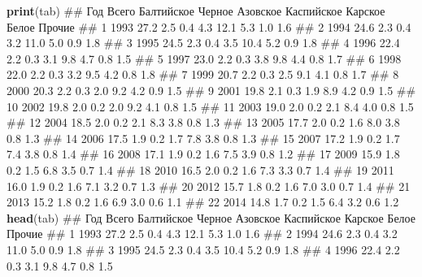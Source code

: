\documentclass[]{book}
\newenvironment{Shaded}{\begin{snugshade}}{\end{snugshade}}
\newcommand{\KeywordTok}[1]{\textcolor[rgb]{0.13,0.29,0.53}{\textbf{#1}}}
\newcommand{\NormalTok}[1]{#1}
\begin{document}
\begin{Shaded}
\begin{Highlighting}[]
\KeywordTok{print}\NormalTok{(tab)}
\NormalTok{##     Год Всего Балтийское Черное Азовское Каспийское Карское Белое Прочие}
\NormalTok{## 1  1993  27.2        2.5    0.4      4.3       12.1     5.3   1.0    1.6}
\NormalTok{## 2  1994  24.6        2.3    0.4      3.2       11.0     5.0   0.9    1.8}
\NormalTok{## 3  1995  24.5        2.3    0.4      3.5       10.4     5.2   0.9    1.8}
\NormalTok{## 4  1996  22.4        2.2    0.3      3.1        9.8     4.7   0.8    1.5}
\NormalTok{## 5  1997  23.0        2.2    0.3      3.8        9.8     4.4   0.8    1.7}
\NormalTok{## 6  1998  22.0        2.2    0.3      3.2        9.5     4.2   0.8    1.8}
\NormalTok{## 7  1999  20.7        2.2    0.3      2.5        9.1     4.1   0.8    1.7}
\NormalTok{## 8  2000  20.3        2.2    0.3      2.0        9.2     4.2   0.9    1.5}
\NormalTok{## 9  2001  19.8        2.1    0.3      1.9        8.9     4.2   0.9    1.5}
\NormalTok{## 10 2002  19.8        2.0    0.2      2.0        9.2     4.1   0.8    1.5}
\NormalTok{## 11 2003  19.0        2.0    0.2      2.1        8.4     4.0   0.8    1.5}
\NormalTok{## 12 2004  18.5        2.0    0.2      2.1        8.3     3.8   0.8    1.3}
\NormalTok{## 13 2005  17.7        2.0    0.2      1.6        8.0     3.8   0.8    1.3}
\NormalTok{## 14 2006  17.5        1.9    0.2      1.7        7.8     3.8   0.8    1.3}
\NormalTok{## 15 2007  17.2        1.9    0.2      1.7        7.4     3.8   0.8    1.4}
\NormalTok{## 16 2008  17.1        1.9    0.2      1.6        7.5     3.9   0.8    1.2}
\NormalTok{## 17 2009  15.9        1.8    0.2      1.5        6.8     3.5   0.7    1.4}
\NormalTok{## 18 2010  16.5        2.0    0.2      1.6        7.3     3.3   0.7    1.4}
\NormalTok{## 19 2011  16.0        1.9    0.2      1.6        7.1     3.2   0.7    1.3}
\NormalTok{## 20 2012  15.7        1.8    0.2      1.6        7.0     3.0   0.7    1.4}
\NormalTok{## 21 2013  15.2        1.8    0.2      1.6        6.9     3.0   0.6    1.1}
\NormalTok{## 22 2014  14.8        1.7    0.2      1.5        6.4     3.2   0.6    1.2}
\KeywordTok{head}\NormalTok{(tab)}
\NormalTok{##    Год Всего Балтийское Черное Азовское Каспийское Карское Белое Прочие}
\NormalTok{## 1 1993  27.2        2.5    0.4      4.3       12.1     5.3   1.0    1.6}
\NormalTok{## 2 1994  24.6        2.3    0.4      3.2       11.0     5.0   0.9    1.8}
\NormalTok{## 3 1995  24.5        2.3    0.4      3.5       10.4     5.2   0.9    1.8}
\NormalTok{## 4 1996  22.4        2.2    0.3      3.1        9.8     4.7   0.8    1.5}

\end{Highlighting}
\end{Shaded}
\end{document}
